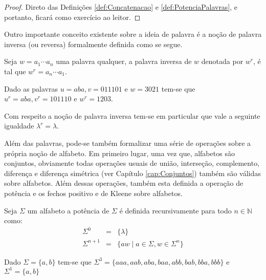 \begin{proof}
	Direto das Definições \ref{def:Concatenacao} e \ref{def:PotenciaPalavras}, e portanto, ficará como exercício ao leitor.
\end{proof}

Outro importante conceito existente sobre a ideia de palavra é a noção de palavra inversa (ou reversa) formalmente definida como se segue.

\begin{definition}\label{def:PalavraInversa}
	\cite{valdi2016master} Seja $w = a_1\cdots a_n$ uma palavra qualquer, a palavra inversa de $w$ denotada por $w^r$, é tal que $w^r = a_n\cdots a_1$. 
\end{definition}

\begin{exem}
	Dado as palavras $u = aba, v = 011101$ e $w = 3021$ tem-se que $u^r = aba, v^r = 101110$ e $w^r = 1203$.
\end{exem}

\begin{rema}
	Com respeito a noção de palavra inversa tem-se em particular que vale a seguinte igualdade $\lambda^r = \lambda$.
\end{rema}

Além das palavras, pode-se também formalizar uma série de operações sobre a própria noção de alfabeto. Em primeiro lugar, uma vez que,  alfabetos são conjuntos, obviamente todas operações usuais de união, interseção, complemento, diferença e diferença simétrica (ver Capítulo \ref{cap:Conjuntos}) também são válidas sobre alfabetos. Além dessas operações, também esta definida a operação de potência e os fechos positivo e de Kleene sobre alfabetos.

\begin{definition}\label{def:PotenciaAlfabeto}
	\cite{benjaLivro2010} Seja $\Sigma$ um alfabeto a potência de $\Sigma$ é definida recursivamente para todo $n \in \mathbb{N}$ como:
	\begin{eqnarray}
		\Sigma^0 & = & \{\lambda\}\\
		\Sigma^{n+1} & = & \{aw \mid a \in \Sigma, w \in \Sigma^{n}\}
	\end{eqnarray}
\end{definition} 

\begin{exem}
	Dado $\Sigma = \{a, b\}$ tem-se que $\Sigma^3 = \{aaa, aab, aba, baa, abb, bab, bba, bbb\}$ e $\Sigma^1 = \{a, b\}$
\end{exem}

